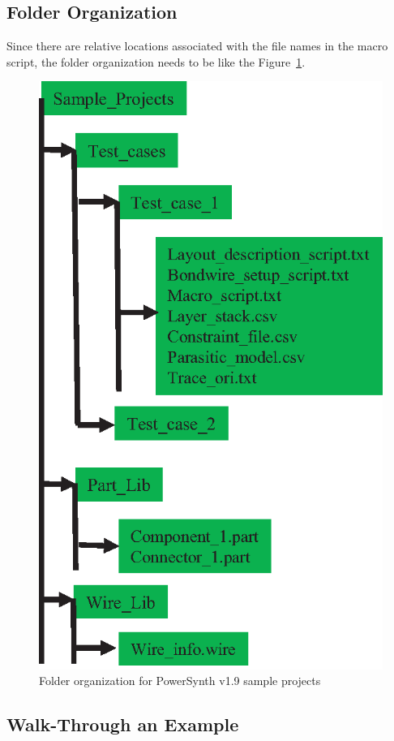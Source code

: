 \documentclass[11pt]{article}
\begin{document}
\subsection{Folder Organization}
Since there are relative locations associated with the file names in the macro script, the folder organization needs to be like the Figure~\ref{folder_org}. 


    \begin{figure}[H]
    \centering
    \includegraphics[width=3.5 in, height=5.8 in ]{figs/v_1.9_figs/folder_org.eps}
    \caption{Folder organization for PowerSynth v1.9 sample projects}
    \label{folder_org}
    \end{figure}

\pagebreak

\subsection{Walk-Through an Example}
    
\end{document}
